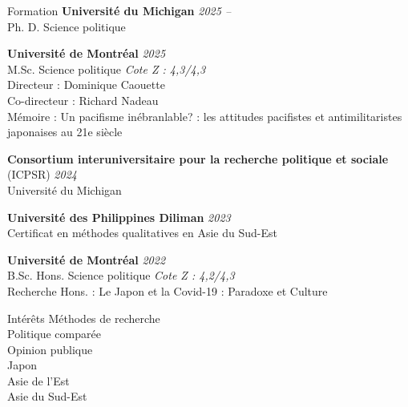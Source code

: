 \documentclass{resume} %
\begin{document}

\begin{rSection}{Formation}
{\bf Université du Michigan} \hfill {\em 2025 -- }
\\ Ph. D. Science politique

{\bf Université de Montréal} \hfill {\em 2025} 
\\ M.Sc. Science politique \hfill {\em Cote Z : 4,3/4,3}
\\ Directeur : Dominique Caouette 
\\ Co-directeur : Richard Nadeau
\\ Mémoire : Un pacifisme inébranlable? : les attitudes pacifistes et antimilitaristes japonaises au 21e siècle

{\bf Consortium interuniversitaire pour la recherche politique et sociale} (ICPSR) \hfill {\em 2024} 
\\Université du Michigan \hfill 

{\bf Université des Philippines Diliman} \hfill {\em 2023} 
\\ Certificat en méthodes qualitatives en Asie du Sud-Est\hfill 

{\bf Université de Montréal} \hfill {\em 2022}
\\ B.Sc. Hons. Science politique \hfill {\em Cote Z : 4,2/4,3}
\\ Recherche Hons. : Le Japon et la Covid-19 : Paradoxe et Culture

\end{rSection}


\begin{rSection}{Intérêts}
Méthodes de recherche
\\ Politique comparée
\\ Opinion publique
\\ Japon
\\ Asie de l'Est
\\ Asie du Sud-Est
\end{rSection}
\end{document}
